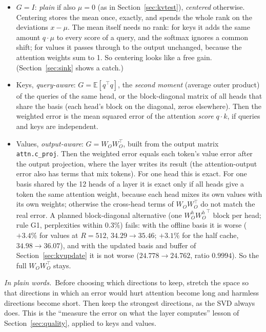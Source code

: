 \documentclass[10pt]{article}
\theoremstyle{plain}
\theoremstyle{definition}
\theoremstyle{remark}
\newcommand{\E}{\mathbb{E}}
\newcommand{\T}{^{\top}}
\newcommand{\mtx}[1]{\texttt{#1}}
\newcommand{\plain}{\noindent\emph{In plain words.}\ }
\newcommand{\rl}[1]{\textsf{#1}}%
\begin{document}
\begin{itemize}[leftmargin=2em,itemsep=1pt]
\item $G=I$: \emph{plain} if also $\mu=0$ (as in Section~\ref{sec:kvtest}), \emph{centered} otherwise. Centering stores the mean once, exactly, and spends the whole rank on the deviations $x-\mu$. The mean itself needs no rank: for keys it adds the same amount $q\cdot\mu$ to every score of a query, and the softmax ignores a common shift; for values it passes through to the output unchanged, because the attention weights sum to 1. So centering looks like a free gain. (Section~\ref{sec:sink} shows a catch.)
\item Keys, \emph{query-aware}: $G=\E[q\T q]$, the \emph{second moment} (average outer product) of the queries of the same head, or the block-diagonal matrix of all heads that share the basis (each head's block on the diagonal, zeros elsewhere). Then the weighted error is the mean squared error of the attention \emph{score} $q\cdot k$, if queries and keys are independent.
\item Values, \emph{output-aware}: $G=W_OW_O\T$, built from the output matrix \mtx{attn.c\_proj}. Then the weighted error equals each token's value error after the output projection, where the layer writes its result (the attention-output error also has terms that mix tokens). For one head this is exact. For one basis shared by the 12 heads of a layer it is exact only if all heads give a token the same attention weight, because each head mixes its own values with its own weights; otherwise the cross-head terms of $W_OW_O\T$ do not match the real error. A planned block-diagonal alternative (one $W_O^h{W_O^h}\T$ block per head; rule \rl{G1}, perplexities within $0.3\%$) fails: with the offline basis it is worse ($+3.4\%$ for values at $R=512$, $34.29\to35.46$; $+3.1\%$ for the half cache, $34.98\to36.07$), and with the updated basis and buffer of Section~\ref{sec:kvupdate} it is not worse ($24.778\to24.762$, ratio $0.9994$). So the full $W_OW_O\T$ stays.
\end{itemize}

\plain Before choosing which directions to keep, stretch the space so that directions in which an error would hurt attention become long and harmless directions become short. Then keep the strongest directions, as the SVD always does. This is the ``measure the error on what the layer computes'' lesson of Section~\ref{sec:quality}, applied to keys and values.
\end{document}
